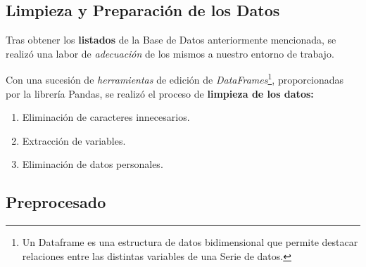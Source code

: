  \subsection{Limpieza y Preparación de los Datos}

 Tras obtener los \textbf{listados} de la Base de Datos anteriormente mencionada, se realizó una labor de \textit{adecuación} de los mismos a nuestro entorno de trabajo.

 Con una sucesión de \textit{herramientas} de edición de \textit{DataFrames}\footnote{Un Dataframe es una estructura de datos bidimensional que permite destacar relaciones entre las distintas variables de una Serie de datos. }, proporcionadas por la librería Pandas, se realizó el proceso de \textbf{limpieza de los datos: }
 \begin{enumerate}
     \item Eliminación de caracteres innecesarios.
     \item Extracción de variables.
     \item Eliminación de datos personales.
 \end{enumerate}



\subsection{Preprocesado}
 